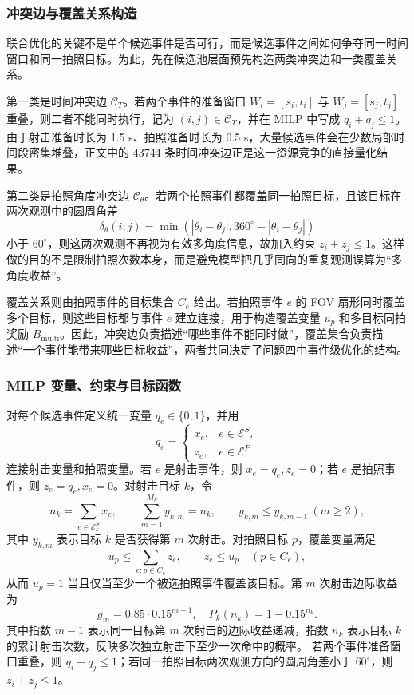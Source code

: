 \documentclass{cumcmthesis}
\begin{document}
\subsubsection{冲突边与覆盖关系构造}
联合优化的关键不是单个候选事件是否可行，而是候选事件之间如何争夺同一时间窗口和同一拍照目标。为此，先在候选池层面预先构造两类冲突边和一类覆盖关系。

第一类是时间冲突边 $\mathcal C_T$。若两个事件的准备窗口 $W_i=[s_i,t_i]$ 与 $W_j=[s_j,t_j]$ 重叠，则二者不能同时执行，记为 $(i,j)\in\mathcal C_T$，并在 MILP 中写成 $q_i+q_j\le 1$。由于射击准备时长为 1.5 s、拍照准备时长为 0.5 s，大量候选事件会在少数局部时间段密集堆叠，正文中的 43744 条时间冲突边正是这一资源竞争的直接量化结果。

第二类是拍照角度冲突边 $\mathcal C_\theta$。若两个拍照事件都覆盖同一拍照目标，且该目标在两次观测中的圆周角差
\[
  \delta_\theta(i,j)=\min(|\theta_i-\theta_j|,360^\circ-|\theta_i-\theta_j|)
\]
小于 $60^\circ$，则这两次观测不再视为有效多角度信息，故加入约束 $z_i+z_j\le 1$。这样做的目的不是限制拍照次数本身，而是避免模型把几乎同向的重复观测误算为“多角度收益”。

覆盖关系则由拍照事件的目标集合 $C_e$ 给出。若拍照事件 $e$ 的 FOV 扇形同时覆盖多个目标，则这些目标都与事件 $e$ 建立连接，用于构造覆盖变量 $u_p$ 和多目标同拍奖励 $B_{\mathrm{multi}}$。因此，冲突边负责描述“哪些事件不能同时做”，覆盖集合负责描述“一个事件能带来哪些目标收益”，两者共同决定了问题四中事件级优化的结构。

\subsubsection{MILP 变量、约束与目标函数}
对每个候选事件定义统一变量 $q_e\in\{0,1\}$，并用
\[
q_e=
\begin{cases}
x_e,& e\in\mathcal E^S,\\
z_e,& e\in\mathcal E^P
\end{cases}
\]
连接射击变量和拍照变量。若 $e$ 是射击事件，则 $x_e=q_e,z_e=0$；若 $e$ 是拍照事件，则 $z_e=q_e,x_e=0$。对射击目标 $k$，令
\[
  n_k=\sum_{e\in\mathcal E_k^{S}}x_e,\qquad
  \sum_{m=1}^{M_k} y_{k,m}=n_k,\qquad
  y_{k,m}\le y_{k,m-1}\ (m\ge2),
\]
其中 $y_{k,m}$ 表示目标 $k$ 是否获得第 $m$ 次射击。对拍照目标 $p$，覆盖变量满足
\[
  u_p\le \sum_{e:p\in C_e}z_e,\qquad
  z_e\le u_p\quad (p\in C_e),
\]
从而 $u_p=1$ 当且仅当至少一个被选拍照事件覆盖该目标。第 $m$ 次射击边际收益为
\[
  g_m=0.85\cdot0.15^{m-1},\quad P_k(n_k)=1-0.15^{n_k}.
\]
其中指数 $m-1$ 表示同一目标第 $m$ 次射击的边际收益递减，指数 $n_k$ 表示目标 $k$ 的累计射击次数，反映多次独立射击下至少一次命中的概率。
若两个事件准备窗口重叠，则 $q_i+q_j\le1$；若同一拍照目标两次观测方向的圆周角差小于 $60^\circ$，则 $z_i+z_j\le1$。
\end{document}
